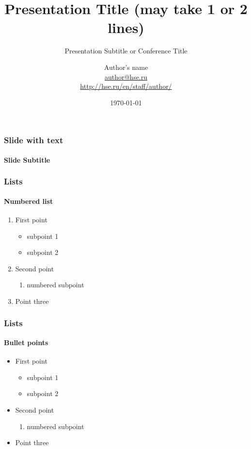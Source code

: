 \documentclass[aspectratio=169]{beamer}
\title[Title]{Presentation Title (may take 1 or 2 lines)}
\subtitle{Presentation Subtitle or Conference Title}
\author[Author's name]{Author's name \\ \smallskip \scriptsize \url{author@hse.ru}\\\url{http://hse.ru/en/staff/author/}}
\institute{Name of the Department}
\date{\today}
\begin{document}
\frame[plain]{\titlepage}

\begin{frame}
\frametitle{Slide with text}
\framesubtitle{Slide Subtitle}
	\blindtext
\end{frame}

\begin{frame}
\frametitle{Lists}
\framesubtitle{Numbered list}
	\begin{enumerate} 
		\item First point
		\begin{itemize}
			\item subpoint 1
			\item subpoint 2
		\end{itemize}
		\item Second point
		\begin{enumerate}
			\item numbered subpoint
		\end{enumerate} 
		\item Point three
	\end{enumerate} 
\end{frame}

\begin{frame}
\frametitle{Lists}
\framesubtitle{Bullet points}
	\begin{itemize}
		\item First point
		\begin{itemize}
			\item subpoint 1
			\item subpoint 2
		\end{itemize}
		\item Second point
		\begin{enumerate}
			\item numbered subpoint
		\end{enumerate} 
		\item Point three
	\end{itemize}
\end{frame}
\end{document}
